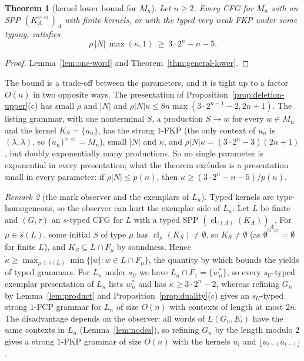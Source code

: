 \documentclass[11pt]{article}
\numberwithin{equation}{section}
\theoremstyle{plain}
\newtheorem{theorem}{Theorem}[section]
\theoremstyle{definition}
\theoremstyle{remark}
\newtheorem{remark}[theorem]{Remark}
\theoremstyle{plain}
\newcommand{\eps}{\lambda}
\newcommand{\RL}{^{\rhd\lhd}}
\newcommand{\cl}{\operatorname{cl}}
\newcommand{\Lfl}{\lfloor}
\newcommand{\Rfl}{\rfloor}
\begin{document}
\begin{theorem}[kernel lower bound for $M_n$]\label{thm:deletion}
Let $n\ge2$.  Every CFG for $M_n$ with an SPP $(K_A\RL)_A$ with finite
kernels, or with the typed very weak FKP under some typing, satisfies
\[
\rho\,|N|\,\max(\kappa,1)\ \ge\ 3\cdot2^n-n-5 .
\]
\end{theorem}
\begin{proof}
Lemma~\ref{lem:one-word} and Theorem~\ref{thm:general-lower}.
\end{proof}

The bound is a trade-off between the parameters, and it is tight up to a
factor $O(n)$ in two opposite ways.  The presentation of
Proposition~\ref{prop:deletion-upper}(c) has small $\rho$ and $|N|$ and
$\rho|N|\kappa\le8n\max(3\cdot2^{n-1}-2,2n+1)$.  The listing grammar, with one
nonterminal $S$, a production $S\to w$ for every $w\in M_n$ and the kernel
$K_S=\{u_n\}$, has the strong $1$-FKP (the only context of $u_n$ is
$(\eps,\eps)$, so $\{u_n\}\RL=M_n$), small $|N|$ and $\kappa$, and
$\rho|N|\kappa=(3\cdot2^n-3)(2n+1)$, but doubly exponentially many productions.
So no single parameter is exponential in every presentation; what the
theorem excludes is a presentation small in every parameter: if
$\rho|N|\le p(n)$, then $\kappa\ge(3\cdot2^n-n-5)/p(n)$.


\begin{remark}[the mark observer and the exemplars of $L_n$]\label{rem:Ln-sU}
Typed kernels are type-homogeneous, so the observer can hurt the exemplar
side of $L_n$.  Let $L$ be finite and $(G,\tau)$ an $s$-typed CFG for $L$ with
a typed SPP $(\cl_{\tau(A)}(K_A))_A$.  For $\mu\in\widehat s(L)$, some
initial $S$ of type $\mu$ has $\cl_\mu(K_S)\ne\emptyset$, so
$K_S\ne\emptyset$ (as $\emptyset\RL=\emptyset$ for finite $L$), and
$K_S\subseteq L\cap F_\mu$ by soundness.  Hence
$\kappa\ge\max_{\mu\in\widehat s(L)}\min\{|w|:w\in L\cap F_\mu\}$, the
quantity by which \citet[Eq.~($\spadesuit$), Cor.~6.6]{kuriyama-tcs1} bounds
the yields of typed grammars.  For $L_n$ under $s_U$ we have
$L_n\cap F_1=\{w^*_n\}$, so every $s_U$-typed exemplar presentation of $L_n$
lists $w^*_n$ and has $\kappa\ge3\cdot2^n-2$, whereas refining $G_n$ by
Lemma~\ref{lem:product} and Proposition~\ref{prop:duality}(c) gives an
$s_U$-typed strong $1$-FCP grammar for $L_n$ of size $O(n)$ with contexts of
length at most $2n$.  The disadvantage depends on the observer: all words of
$L(G_n,E_i)$ have the same contexts in $L_n$ (Lemma~\ref{lem:nodes}), so
refining $G_n$ by the length modulo $2$ gives a strong $1$-FKP grammar of
size $O(n)$ with the kernels $u_i$ and $\Lfl u_{i-1}u_{i-1}\Rfl$.
\end{remark}
\end{document}
